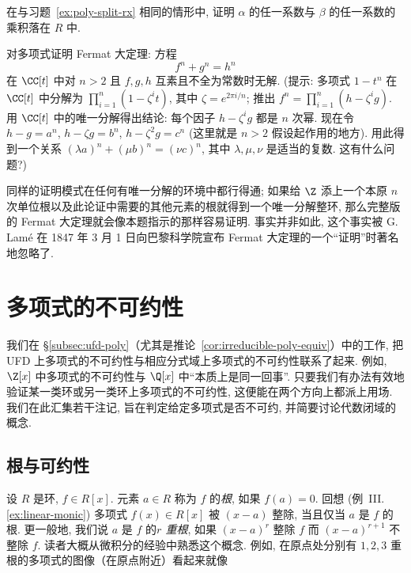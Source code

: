 \begin{prob}
\label{ex:localization-coeff-product}
在与习题~\ref{ex:poly-split-rx} 相同的情形中, 证明 $\alpha$ 的任一系数与 $\beta$ 的任一系数的乘积落在 $R$ 中.
\end{prob}

\begin{prob}
\label{ex:fermat-poly}
对多项式证明 Fermat 大定理: 方程
\[
f^n+g^n=h^n
\]
在 $\CC[t]$ 中对 $n>2$ 且 $f,g,h$ 互素且不全为常数时无解. (提示: 多项式 $1-t^n$ 在 $\CC[t]$ 中分解为 $\prod_{i=1}^{n}(1-\zeta^i t)$, 其中 $\zeta=e^{2\pi i/n}$; 推出 $f^n=\prod_{i=1}^{n}(h-\zeta^i g)$. 用 $\CC[t]$ 中的唯一分解得出结论: 每个因子 $h-\zeta^i g$ 都是 $n$ 次幂. 现在令 $h-g=a^n$, $h-\zeta g=b^n$, $h-\zeta^2 g=c^n$ (这里就是 $n>2$ 假设起作用的地方). 用此得到一个关系 $(\lambda a)^n+(\mu b)^n=(\nu c)^n$, 其中 $\lambda,\mu,\nu$ 是适当的复数. 这有什么问题?)

\noindent 同样的证明模式在任何有唯一分解的环境中都行得通; 如果给 $\Z$ 添上一个本原 $n$ 次单位根以及此论证中需要的其他元素的根就得到一个唯一分解整环, 那么完整版的 Fermat 大定理就会像本题指示的那样容易证明. 事实并非如此, 这个事实被 G. Lam\'e 在 1847 年 3 月 1 日向巴黎科学院宣布 Fermat 大定理的一个``证明''时著名地忽略了.
\end{prob}
\section{多项式的不可约性}
\label{sec:poly-irreducibility}

我们在 \S\ref{subsec:ufd-poly}（尤其是推论~\ref{cor:irreducible-poly-equiv}）中的工作, 把 UFD 上多项式的不可约性与相应分式域上多项式的不可约性联系了起来. 例如, $\Z[x]$ 中多项式的不可约性与 $\Q[x]$ 中``本质上是同一回事''. 只要我们有办法有效地验证某一类环或另一类环上多项式的不可约性, 这便能在两个方向上都派上用场. 我们在此汇集若干注记, 旨在判定给定多项式是否不可约, 并简要讨论代数闭域的概念.

\subsection{根与可约性}
\label{subsec:roots-reducibility}

设 $R$ 是环, $f\in R[x]$. 元素 $a\in R$ 称为 $f$ 的\emph{根}, 如果 $f(a)=0$. 回想 (例~III.\ref{ex:linear-monic}) 多项式 $f(x)\in R[x]$ 被 $(x-a)$ 整除, 当且仅当 $a$ 是 $f$ 的根. 更一般地, 我们说 $a$ 是 $f$ 的\emph{$r$ 重根}, 如果 $(x-a)^r$ 整除 $f$ 而 $(x-a)^{r+1}$ 不整除 $f$. 读者大概从微积分的经验中熟悉这个概念. 例如, 在原点处分别有 $1,2,3$ 重根的多项式的图像（在原点附近）看起来就像

